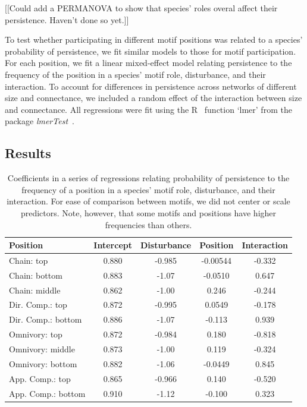 \documentclass[12pt]{article}
\begin{document}
\begin{spacing}{2.0}
        
        [[Could add a PERMANOVA to show that species' roles overal affect their persistence. Haven't done so yet.]]
        

        To test whether participating in different motif positions was related to a species' probability of persistence, we fit similar models to those for motif participation.
        For each position, we fit a linear mixed-effect model relating persistence to the frequency of the position in a species' motif role, disturbance, and their interaction.
        To account for differences in persistence across networks of different size and connectance, we included a random effect of the interaction between size and connectance.
        All regressions were fit using the R~\citep{R} function `lmer' from the package \emph{lmerTest}~\citep{lmerTest}.

    
    \subsection*{Results}

    \begin{table}[h!]
        \caption{Coefficients in a series of regressions relating probability of persistence to the frequency of a position in a species' motif role, disturbance, and their interaction. For ease of comparison between motifs, we did not center or scale predictors. Note, however, that some motifs and positions have higher frequencies than others.}
        \label{tab:persistence_vs_positions}
        \centering
        \begin{tabular}{l | c c c c}
        Position    & Intercept & Disturbance   & Position  & Interaction \\
        \hline
        Chain: top  & 0.880 &   -0.985 & -0.00544 & -0.332 \\
        Chain: bottom   & 0.883 &   -1.07 & -0.0510 &   0.647 \\
        Chain: middle   & 0.862 & -1.00 &   0.246 & -0.244 \\
        \hline
        Dir. Comp.: top & 0.872 &   -0.995  & 0.0549 &  -0.178 \\
        Dir. Comp.: bottom & 0.886 &    -1.07 & -0.113 &    0.939 \\
        \hline
        Omnivory: top   & 0.872 &   -0.984 &    0.180 & -0.818 \\
        Omnivory: middle & 0.873 & -1.00 &  0.119 & -0.324 \\
        Omnivory: bottom & 0.882 & -1.06 &  -0.0449 &   0.845 \\
        \hline
        App. Comp.: top & 0.865 &   -0.966 &    0.140 & -0.520 \\
        App. Comp.: bottom & 0.910 &    -1.12 & -0.100 &    0.323 \\
        \hline
        \end{tabular}
    \end{table}



\end{spacing}
\end{document}
